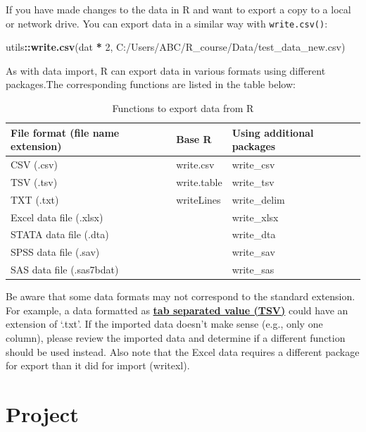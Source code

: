 \documentclass[
]{book}
\newenvironment{Shaded}{\begin{snugshade}}{\end{snugshade}}
\newcommand{\DecValTok}[1]{\textcolor[rgb]{0.00,0.00,0.81}{#1}}
\newcommand{\FunctionTok}[1]{\textcolor[rgb]{0.13,0.29,0.53}{\textbf{#1}}}
\newcommand{\NormalTok}[1]{#1}
\newcommand{\SpecialCharTok}[1]{\textcolor[rgb]{0.81,0.36,0.00}{\textbf{#1}}}
\newcommand{\StringTok}[1]{\textcolor[rgb]{0.31,0.60,0.02}{#1}}
\begin{document}
If you have made changes to the data in R and want to export a copy to a local or network drive. You can export data in a similar way with \texttt{write.csv()}:

\begin{Shaded}
\begin{Highlighting}[]
\NormalTok{utils}\SpecialCharTok{::}\FunctionTok{write.csv}\NormalTok{(dat }\SpecialCharTok{*} \DecValTok{2}\NormalTok{, }\StringTok{\textquotesingle{}C:/Users/ABC/R\_course/Data/test\_data\_new.csv\textquotesingle{}}\NormalTok{)}
\end{Highlighting}
\end{Shaded}

As with data import, R can export data in various formats using different packages.The corresponding functions are listed in the table below:

\begin{table}

\caption{\label{tab:data-export}Functions to export data from R}
\centering
\begin{tabular}[t]{l|l|l}
\hline
File format (file name extension) & Base R & Using additional packages\\
\hline
CSV (.csv) & write.csv & write\_csv\\
\hline
TSV (.tsv) & write.table & write\_tsv\\
\hline
TXT (.txt) & writeLines & write\_delim\\
\hline
Excel data file (.xlsx) &  & write\_xlsx\\
\hline
STATA data file (.dta) &  & write\_dta\\
\hline
SPSS data file (.sav) &  & write\_sav\\
\hline
SAS data file (.sas7bdat) &  & write\_sas\\
\hline
\end{tabular}
\end{table}

Be aware that some data formats may not correspond to the standard extension. For example, a data formatted as \textbf{\hyperref[acronyms_TSV]{tab separated value (TSV)}} could have an extension of `.txt'. If the imported data doesn't make sense (e.g., only one column), please review the imported data and determine if a different function should be used instead. Also note that the Excel data requires a different package for export than it did for import (writexl).

\section{Project}\label{sec:project}
\end{document}
